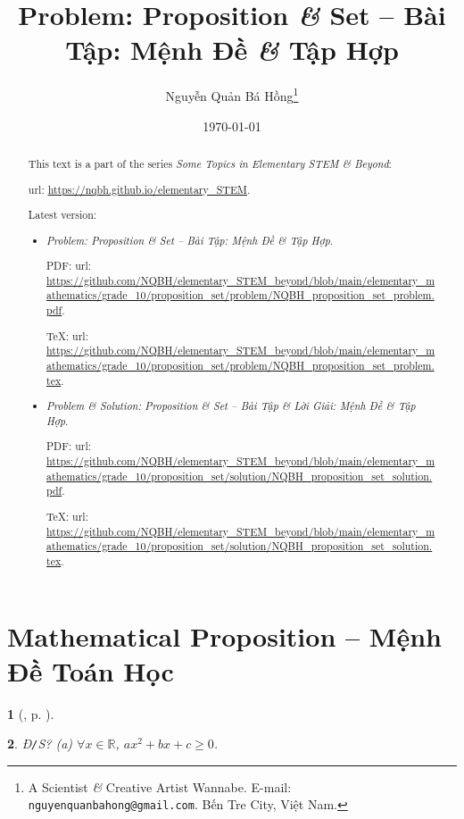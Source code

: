 \documentclass{article}
\title{Problem: Proposition {\it\&} Set -- Bài Tập: Mệnh Đề {\it\&} Tập Hợp}
\author{Nguyễn Quản Bá Hồng\footnote{A Scientist {\it\&} Creative Artist Wannabe. E-mail: {\tt nguyenquanbahong@gmail.com}. Bến Tre City, Việt Nam.}}
\date{\today}
\newtheorem{baitoan}{}
\begin{document}
\maketitle
\begin{abstract}
	This text is a part of the series {\it Some Topics in Elementary STEM \& Beyond}:
	
	{\sc url}: \url{https://nqbh.github.io/elementary_STEM}.
	
	Latest version:
	\begin{itemize}
		\item {\it Problem: Proposition \& Set -- Bài Tập: Mệnh Đề \& Tập Hợp}.
		
		PDF: {\sc url}: \url{https://github.com/NQBH/elementary_STEM_beyond/blob/main/elementary_mathematics/grade_10/proposition_set/problem/NQBH_proposition_set_problem.pdf}.
		
		\TeX: {\sc url}: \url{https://github.com/NQBH/elementary_STEM_beyond/blob/main/elementary_mathematics/grade_10/proposition_set/problem/NQBH_proposition_set_problem.tex}.
		\item {\it Problem \& Solution: Proposition \& Set -- Bài Tập \& Lời Giải: Mệnh Đề \& Tập Hợp}.
		
		PDF: {\sc url}: \url{https://github.com/NQBH/elementary_STEM_beyond/blob/main/elementary_mathematics/grade_10/proposition_set/solution/NQBH_proposition_set_solution.pdf}.
		
		\TeX: {\sc url}: \url{https://github.com/NQBH/elementary_STEM_beyond/blob/main/elementary_mathematics/grade_10/proposition_set/solution/NQBH_proposition_set_solution.tex}.
	\end{itemize}
\end{abstract}
\tableofcontents


\section{Mathematical Proposition -- Mệnh Đề Toán Học}

\begin{baitoan}[\cite{Hai_Hung_Thu_Tung2022_tap_1}, p. ]
	
\end{baitoan}

\begin{baitoan}
	{\rm Đ{\tt/}S?} (a) $\forall x\in\mathbb{R}$, $ax^2 + bx + c\ge0$.
\end{baitoan}
\end{document}
